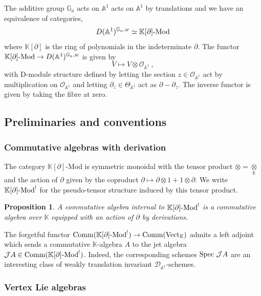 \documentclass[11pt]{amsart}
\numberwithin{equation}{section}
\newtheorem{prop}[theo]{Proposition}
\theoremstyle{definition}
\newcommand{\bb}{\mathbb}
\newcommand{\mc}{\mathcal}
\newcommand{\D}{{\mathcal{D}}}
\DeclareMathOperator{\Vect}{Vect}
\newcommand{\Mod}{{\textup{-Mod}}}
\newcommand{\ik}{{\bb K}}
\newcommand{\Spec}{{\textup{Spec\ }}}
\newcommand{\Comm}{{\textup{Comm}}}
\newcommand{\0}{{\textbf{0}}}
\newcommand{\DD}{{D}}
\newcommand{\del}{{{\partial}}}
\def\IA{\mathbb{A}}
\def\IG{\mathbb{G}}
\def\JJ{{\mc J}}
\def\OO{{\mc O}}
\newcommand{\tensor}[1]{\underset{#1}{\otimes}}
\begin{document}
The additive group $\IG_a$ acts on $\IA^1$ acts on $\IA^1$ by translations and we have an equivalence of categories,
\[
\DD(\IA^1)^{\IG_a,w} \simeq \ik[\partial]\textup{-Mod}
\]
where $\ik[\partial]$ is the ring of polynomials in the indeterminate $\del$. The functor $\ik[\partial]\textup{-Mod}\rightarrow D(\IA^1)^{\IG_a,w}$ is given by
\[
V \mapsto V\otimes \OO_{\IA^1}~,
\]
with D-module structure defined by letting the section $z\in \OO_{\IA^1}$ act by multiplication on $\OO_{\IA^1}$ and letting $\partial_z\in \Theta_{\IA^1}$ act as $\partial - \partial_z$. The inverse functor is given by taking the fibre at zero.

\subsection{Preliminaries and conventions}


\subsubsection{Commutative algebras with derivation}

The category $\ik[\partial]$-Mod is symmetric monoidal with the tensor product $\otimes = \tensor{\ik}$ and the action of $\partial$ given by the coproduct $\partial\mapsto \partial\otimes1 +1\otimes \partial$. We write $\ik[\partial]\Mod^!$ for the pseudo-tensor structure induced by this tensor product.
\begin{prop}
	A commutative algebra internal to $\ik[\partial]\Mod^!$ is a commutative algebra over $\ik$ equipped with an action of $\partial$ by derivations.
\end{prop}

The forgetful functor $\Comm(\ik[\partial]\Mod^!)\rightarrow \Comm(\Vect_\ik)$ admits a left adjoint which sends a commutative $\ik$-algebra $A$ to the jet algebra $\JJ A\in \Comm(\ik[\partial]\Mod^!)$.
Indeed, the corresponding schemes $\Spec \JJ A$ are an interesting class of weakly translation invariant $\D_{\IA^1}$-schemes.


\subsubsection{Vertex Lie algebras}
\end{document}

